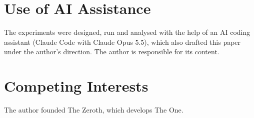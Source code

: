 \section*{Use of AI Assistance}
The experiments were designed, run and analysed with the help of an AI coding assistant (Claude Code
with Claude Opus 5.5), which also drafted this paper under the author's direction. The author is
responsible for its content.

\section*{Competing Interests}
The author founded The Zeroth, which develops The One.
